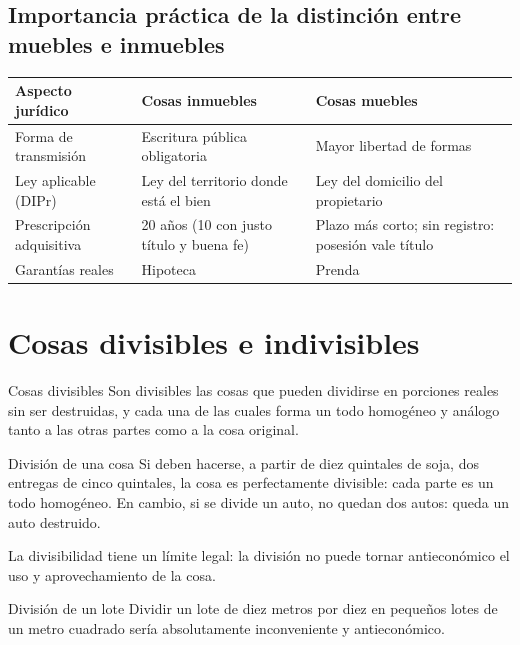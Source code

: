 \documentclass[12pt,oneside]{book}
\newenvironment{tabla}{%
    \par\medskip\begingroup\small\renewcommand{\arraystretch}{1.3}\noindent\ignorespaces
}{%
    \par\endgroup\medskip
}
\begin{document}
\subsection{Importancia práctica de la distinción entre muebles e inmuebles}

\begin{tabla}
\begin{tabularx}{\textwidth}{B{3.4cm}YY}
\toprule
Aspecto jurídico & \textbf{Cosas inmuebles} & \textbf{Cosas muebles} \\
\midrule
Forma de transmisión & Escritura pública obligatoria & Mayor libertad de formas \\
Ley aplicable (DIPr) & Ley del territorio donde está el bien & Ley del domicilio del propietario \\
Prescripción adquisitiva & 20 años (10 con justo título y buena fe) & Plazo más corto; sin registro: posesión vale título \\
Garantías reales & Hipoteca & Prenda \\
\bottomrule
\end{tabularx}
\end{tabla}

\section{Cosas divisibles e indivisibles}

\begin{definition}{Cosas divisibles}
Son divisibles las cosas que pueden dividirse en porciones reales sin ser destruidas, y cada una de las cuales forma un todo homogéneo y análogo tanto a las otras partes como a la cosa original.
\end{definition}

\begin{example}{División de una cosa}
Si deben hacerse, a partir de diez quintales de soja, dos entregas de cinco quintales, la cosa es perfectamente divisible: cada parte es un todo homogéneo. En cambio, si se divide un auto, no quedan dos autos: queda un auto destruido.
\end{example}

La divisibilidad tiene un límite legal: la división no puede tornar antieconómico el uso y aprovechamiento de la cosa.

\begin{example}{División de un lote}
Dividir un lote de diez metros por diez en pequeños lotes de un metro cuadrado sería absolutamente inconveniente y antieconómico.
\end{example}
\end{document}
